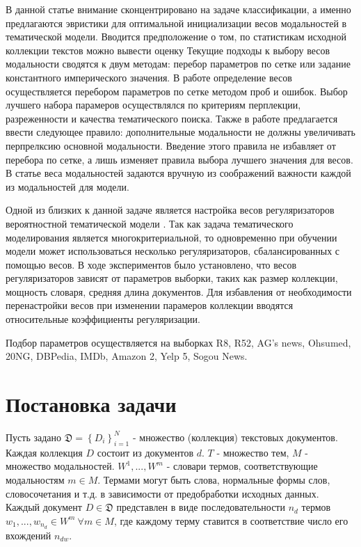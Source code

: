 \documentclass[12pt, twoside]{article}
\begin{document}
В данной статье внимание сконцентрировано на задаче классификации, а именно предлагаются эвристики для оптимальной инициализации весов модальностей в тематической модели. Вводится предположение о том, по статистикам исходной коллекции текстов можно вывести оценку 
Текущие подходы к выбору весов модальности сводятся к двум методам: перебор параметров по сетке или задание константного имперического значения. В работе \cite{vorontsov/blog_search} определение весов осуществляется перебором параметров по сетке методом проб и ошибок. Выбор лучшего набора парамеров осуществлялся по критериям перплекции, разреженности и качества тематического поиска. Также в работе \cite{vorontsov/transactions} предлагается ввести следующее правило: дополнительные модальности не должны увеличивать перпрелксию основной модальности. Введение этого правила не избавляет от перебора по сетке, а лишь изменяет правила выбора лучшего значения для весов. В статье \cite{vorontsov/hierarchical} веса модальностей задаются вручную из соображений важности каждой из модальностей для модели.

Одной из близких к данной задаче является настройка весов регуляризаторов вероятностной тематической модели \cite{vorontsov/artm_book}. Так как задача тематического моделирования является многокритериальной, то одновременно при обучении модели может использоваться несколько регуляризаторов, сбалансированных с помощью весов. В ходе экспериментов было установлено, что весов регуляризаторов зависят от параметров выборки, таких как размер коллекции, мощность словаря, средняя длина документов. Для избавления от необходимости перенастройки весов при изменении парамеров коллекции вводятся относительные коэффициенты регуляризации.

Подбор параметров осуществляется на выборках R8, R52, AG's news, Ohsumed, 20NG, DBPedia, IMDb, Amazon 2, Yelp 5, Sogou News. %

\section{Постановка задачи}
Пусть задано $\mathfrak{D} = \left\{D_i\right\}_{i=1}^{N}$ - множество (коллекция) текстовых документов. Каждая коллекция $D$ состоит из документов $d$. $T$ - множество тем, $M$ - множество модальностей. $W^1,...,W^m$ - словари термов, соответствующие модальностям $m \in M$. Термами могут быть слова, нормальные формы слов, словосочетания и т.д. в зависимости от предобработки исходных данных. Каждый документ $D \in \mathfrak{D}$ представлен в виде последовательности $n_d$ термов $w_1,...,w_{n_d} \in W^m \ \forall m \in M$, где каждому терму ставится в соответствие число его вхождений $n_{dw}$. 
\end{document}
